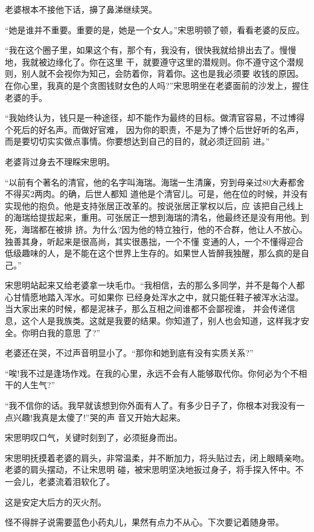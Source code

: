 \documentclass[11pt,a4paper,onecolumn]{article}
\begin{document}
老婆根本不接他下话，擤了鼻涕继续哭。

``她是谁并不重要。重要的是，她是一个女人。''宋思明顿了顿，看看老婆的反应。

``我在这个圈子里，如果这个有，那个有，我没有，很快我就给排出去了。慢慢地，我就被边缘化了。你在这里
干，就要遵守这里的潜规则。你不遵守这个潜规则，别人就不会视你为知己，会防着你，背着你。这也是我必须要
收钱的原因。在你心里，我真的是个贪图钱财女色的人吗?''宋思明坐在老婆面前的沙发上，握住老婆的手。

``我始终认为，钱只是一种途径，却不能作为最终的目标。做清官容易，不过博得个死后的好名声。而做好官难，
因为你的职责，不是为了博个后世好听的名声，而是要切切实实做点事情。你要想达到自己的目的，就必须迂回前
进。''

老婆背过身去不理睬宋思明。

``以前有个著名的清官，他的名字叫海瑞。海瑞一生清廉，穷到母亲过80大寿都舍不得买2两肉。的确，后世人都知
道他是个清官儿。可是，他在位的时候，并没有实现他的抱负。他是支持张居正改革的。按说张居正掌权以后，应
该把自己线上的海瑞给提拔起来，重用。可张居正一想到海瑞的清名，他最终还是没有用他。到死，海瑞都在被排
挤。为什么?因为他的特立独行，他的不合群，他让人不放心。独善其身，听起来是很高尚，其实很愚拙，一个不懂
变通的人，一个不懂得迎合低级趣味的人，是不能在这个世界上生存的。如果世人皆醉我独醒，那么疯的是自己。''

宋思明站起来又给老婆拿一块毛巾。``我相信，去的那么多同学，并不是每个人都心甘情愿地踏入浑水。可如果你
已经身处浑水之中，就只能任鞋子被浑水沾湿。当大家出来的时候，都是泥袜子，那么互相之间谁都不会鄙视谁，
并会传递信息，这个人是我族类。这就是我要的结果。你知道了，别人也会知道，这样我才安全。你明白我的意思
了?''

老婆还在哭，不过声音明显小了。``那你和她到底有没有实质关系?''

``唉!我不过是逢场作戏。在我的心里，永远不会有人能够取代你。你何必为个不相干的人生气?''

``我不信你的话。我早就该想到你外面有人了。有多少日子了，你根本对我没有一点兴趣!我真是太傻了!''哭的声
音又开始大起来。

宋思明叹口气，关键时刻到了，必须挺身而出。

宋思明抚摸着老婆的肩头，非常温柔，并不断加力，将头贴过去，闭上眼睛亲吻。老婆的肩头摆动，不让宋思明
碰，被宋思明坚决地扳过身子，将手探入怀中。不一会儿，老婆流着泪软化了。

这是安定大后方的灭火剂。

怪不得胖子说需要蓝色小药丸儿，果然有点力不从心。下次要记着随身带。
\end{document}
